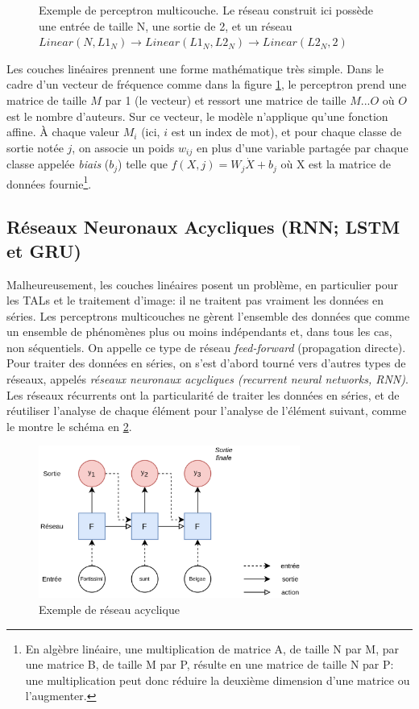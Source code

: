 \begin{figure}[h]
\begin{minipage}{.60\linewidth}
        \caption{Exemple de perceptron multicouche. Le réseau construit ici possède une entrée de taille N, une sortie de 2, et un réseau $Linear(N, L1_N) \rightarrow Linear(L1_N, L2_N) \rightarrow Linear(L2_N, 2)$}
        \label{fig:deep-learning:mlp}
    \end{minipage}%
\end{figure}

Les couches linéaires prennent une forme mathématique très simple. Dans le cadre d'un vecteur de fréquence comme dans la figure \ref{fig:deep-learning:mlp}, le perceptron prend une matrice de taille $M$ par 1 (le vecteur) et ressort une matrice de taille $M...O$ où $O$ est le nombre d'auteurs. Sur ce vecteur, le modèle n'applique qu'une fonction affine. À chaque valeur $M_{i}$ (ici, $i$ est un index de mot), et pour chaque classe de sortie notée $j$, on associe un poids $w_{ij}$ en plus d'une variable partagée par chaque classe appelée \textit{biais} ($b_{j}$) telle que $f(X, j) = W_{j} \dot X + b_{j}$  où X est la matrice de données fournie\footnote{En algèbre linéaire, une multiplication de matrice A, de taille N par M, par une matrice B, de taille M par P, résulte en une matrice de taille N par P: une multiplication peut donc réduire la deuxième dimension d'une matrice ou l'augmenter.}.


\subsection{Réseaux Neuronaux Acycliques (RNN; LSTM et GRU)}

Malheureusement, les couches linéaires posent un problème, en particulier pour les TALs et le traitement d'image: il ne traitent pas vraiment les données en séries. Les perceptrons multicouches ne gèrent l'ensemble des données que comme un ensemble de phénomènes plus ou moins indépendants et, dans tous les cas, non séquentiels. On appelle ce type de réseau \textit{feed-forward} (propagation directe). Pour traiter des données en séries, on s'est d'abord tourné vers d'autres types de réseaux, appelés \textit{réseaux neuronaux acycliques (recurrent neural networks, RNN)}. Les réseaux récurrents ont la particularité de traiter les données en séries, et de réutiliser l'analyse de chaque élément pour l'analyse de l'élément suivant, comme le montre le schéma en \ref{fig:deep-learning:rnn}.

\begin{figure}[h]
    \centering
    \includegraphics[height=5cm]{results/deep-learning/explanations/RNN.png}
    \caption{Exemple de réseau acyclique}
    \label{fig:deep-learning:rnn}
\end{figure}

